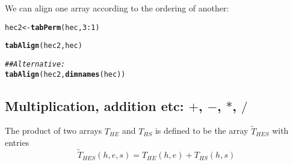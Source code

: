 \documentclass[10pt]{article}\usepackage[]{graphicx}\usepackage[]{xcolor}
\makeatletter
\newcommand{\hlnum}[1]{\textcolor[rgb]{0.686,0.059,0.569}{#1}}%
\newcommand{\hlcom}[1]{\textcolor[rgb]{0.678,0.584,0.686}{\textit{#1}}}%
\newcommand{\hlopt}[1]{\textcolor[rgb]{0,0,0}{#1}}%
\newcommand{\hlstd}[1]{\textcolor[rgb]{0.345,0.345,0.345}{#1}}%
\newcommand{\hlkwb}[1]{\textcolor[rgb]{0.69,0.353,0.396}{#1}}%
\newcommand{\hlkwd}[1]{\textcolor[rgb]{0.737,0.353,0.396}{\textbf{#1}}}%
\newenvironment{kframe}{%
 \def\at@end@of@kframe{}%
 \ifinner\ifhmode%
  \def\at@end@of@kframe{\end{minipage}}%
  \begin{minipage}{\columnwidth}%
 \fi\fi%
 \def\FrameCommand##1{\hskip\@totalleftmargin \hskip-\fboxsep
 \colorbox{shadecolor}{##1}\hskip-\fboxsep
     \hskip-\linewidth \hskip-\@totalleftmargin \hskip\columnwidth}%
 \MakeFramed {\advance\hsize-\width
   \@totalleftmargin\z@ \linewidth\hsize
   \@setminipage}}%
 {\par\unskip\endMakeFramed%
 \at@end@of@kframe}
\newenvironment{knitrout}{}{} %
\makeatother
\begin{document}
We can align one array according to the ordering of another:
\begin{knitrout}\small
{}\color{fgcolor}\begin{kframe}
\begin{alltt}
\hlstd{hec2} \hlkwb{<-} \hlkwd{tabPerm}\hlstd{(hec,} \hlnum{3}\hlopt{:}\hlnum{1}\hlstd{)}
\end{alltt}


{\ttfamily\noindent\bfseries{}}\begin{alltt}
\hlkwd{tabAlign}\hlstd{(hec2, hec)}
\end{alltt}


{\ttfamily\noindent\bfseries{}}\end{kframe}
\end{knitrout}

\begin{knitrout}\small
{}\color{fgcolor}\begin{kframe}
\begin{alltt}
\hlcom{## Alternative:}
\hlkwd{tabAlign}\hlstd{(hec2,} \hlkwd{dimnames}\hlstd{(hec))}
\end{alltt}


{\ttfamily\noindent\bfseries{}}\end{kframe}
\end{knitrout}




\subsection{Multiplication, addition etc:  $+$, $-$, $*$, $/$}
\label{sec:mult-addt-etc}

The product of two arrays $T_{HE}$ and $T_{HS}$ is defined to be the array
$\tilde T_{HES}$ with entries
\begin{displaymath}
  \tilde T_{HES}(h,e,s)= T_{HE}(h,e) + T_{HS}(h,s)
\end{displaymath}
\end{document}
